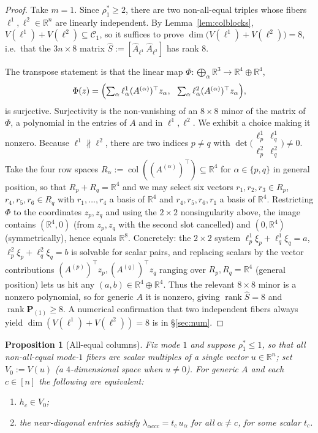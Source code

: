 \documentclass[12pt]{article}
\DeclareMathOperator{\rank}{rank}
\DeclareMathOperator{\col}{col}
\newcommand{\bR}{\mathbb{R}}
\newtheorem{proposition}{Proposition}
\theoremstyle{definition}
\begin{document}
\begin{proof}
Take $m=1$.  Since $\rho_1^\ast\ge2$, there are two non-all-equal triples whose
fibers $\ell^1,\ell^2\in\bR^n$ are linearly independent.  By
Lemma~\ref{lem:colblocks}, $V(\ell^1)+V(\ell^2)\subseteq\mathcal C_1$, so it suffices
to prove $\dim\bigl(V(\ell^1)+V(\ell^2)\bigr)=8$, i.e.\ that the $3n\times8$ matrix
$\widehat S:=[\widehat A_{\ell^1}\ \widehat A_{\ell^2}]$ has rank $8$.

The transpose statement is that the linear map
$\Phi:\bigoplus_{\alpha}\bR^3\to\bR^4\oplus\bR^4$,
\[
\Phi(z)=\Bigl(\textstyle\sum_\alpha\ell^1_\alpha (A^{(\alpha)})^\top z_\alpha,\ \
\sum_\alpha\ell^2_\alpha (A^{(\alpha)})^\top z_\alpha\Bigr),
\]
is surjective.  Surjectivity is the non-vanishing of an $8\times8$ minor of the
matrix of $\Phi$, a polynomial in the entries of $A$ and in $\ell^1,\ell^2$.  We
exhibit a choice making it nonzero.  Because $\ell^1\not\parallel\ell^2$, there are
two indices $p\ne q$ with
$\det\bigl(\begin{smallmatrix}\ell^1_p&\ell^1_q\\ \ell^2_p&\ell^2_q\end{smallmatrix}\bigr)\ne0$.
Take the four row spaces $R_\alpha:=\col((A^{(\alpha)})^\top)\subseteq\bR^4$ for
$\alpha\in\{p,q\}$ in general position, so that $R_p+R_q=\bR^4$ and we may select
six vectors $r_1,r_2,r_3\in R_p$, $r_4,r_5,r_6\in R_q$ with $r_1,\dots,r_4$ a basis
of $\bR^4$ and $r_4,r_5,r_6,r_1$ a basis of $\bR^4$.  Restricting $\Phi$ to the
coordinates $z_p,z_q$ and using the $2\times2$ nonsingularity above, the image
contains $(\bR^4,0)$ (from $z_p,z_q$ with the second slot cancelled) and $(0,\bR^4)$
(symmetrically), hence equals $\bR^8$.  Concretely: the $2\times2$ system
$\ell^1_p\xi_p+\ell^1_q\xi_q=a$, $\ell^2_p\xi_p+\ell^2_q\xi_q=b$ is solvable for
scalar pairs, and replacing scalars by the vector contributions
$(A^{(p)})^\top z_p,(A^{(q)})^\top z_q$ ranging over $R_p,R_q=\bR^4$ (general
position) lets us hit any $(a,b)\in\bR^4\oplus\bR^4$.  Thus the relevant $8\times8$
minor is a nonzero polynomial, so for generic $A$ it is nonzero, giving
$\rank\widehat S=8$ and $\rank\mathbf P_{(1)}\ge8$.  A numerical confirmation that
two independent fibers always yield $\dim(V(\ell^1)+V(\ell^2))=8$ is in
\S\ref{sec:num}.
\end{proof}

\begin{proposition}[All-equal columns]\label{prop:alleq}
Fix mode $1$ and suppose $\rho_1^\ast\le1$, so that all non-all-equal mode-$1$
fibers are scalar multiples of a single vector $u\in\bR^n$; set $V_0:=V(u)$
(a $4$-dimensional space when $u\neq0$).  For generic $A$ and each $c\in[n]$ the
following are equivalent:
\begin{enumerate}[label=\textup{(\alph*)}]
\item $h_c\in V_0$;
\item the near-diagonal entries satisfy $\lambda_{\alpha ccc}=t_c\,u_\alpha$ for all
$\alpha\neq c$, for some scalar $t_c$.
\end{enumerate}
\end{proposition}
\end{document}
